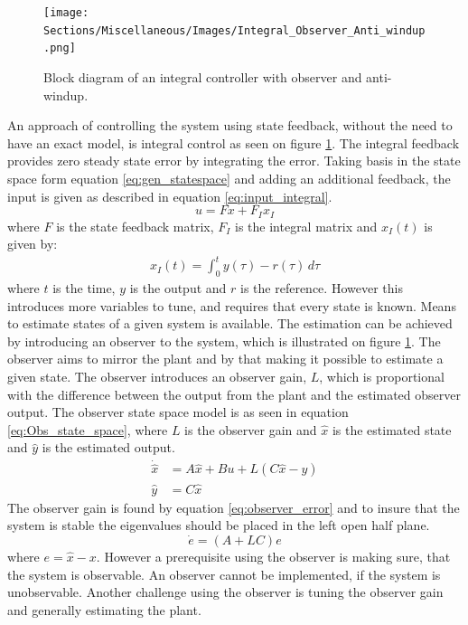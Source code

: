 \documentclass[../../main.tex]{subfiles}
\begin{document}
\begin{figure}
    \centering
    \texttt{[image: Sections/Miscellaneous/Images/Integral\_Observer\_Anti\_windup.png]}
    \caption{Block diagram of an integral controller with observer and anti-windup.}
    \label{fig:Integral_Observer_Diagram}
\end{figure}

An approach of controlling the system using state feedback, without the need to have an exact model, is integral control as seen on figure \ref{fig:Integral_Observer_Diagram}. The integral feedback provides zero steady state error by integrating the error. Taking basis in the state space form equation \ref{eq:gen_statespace} and adding an additional feedback, the input is given as described in equation \ref{eq:input_integral}.
\begin{equation}\label{eq:input_integral}
    u=Fx+F_Ix_I
\end{equation}
where $F$ is the state feedback matrix, $F_I$ is the integral matrix and $x_I(t)$ is given by:
\begin{equation}
    \begin{split}
        x_I(t)=\int_0^t y(\tau)-r(\tau)\,d\tau
    \end{split}
\end{equation}
where $t$ is the time, $y$ is the output and $r$ is the reference. However this introduces more variables to tune, and requires that every state is known. Means to estimate states of a given system is available. The estimation can be achieved by introducing an observer to the system, which is illustrated on figure \ref{fig:Integral_Observer_Diagram}. The observer aims to mirror the plant and by that making it possible to estimate a given state. The observer introduces an observer gain, $L$, which is proportional with the difference between the output from the plant and the estimated observer output. The observer state space model is as seen in equation \ref{eq:Obs_state_space}, where $L$ is the observer gain and $\hat{x}$ is the estimated state and $\hat{y}$ is the estimated output.
\begin{equation}\label{eq:Obs_state_space}
    \begin{split}
        \Dot{\hat{x}}&=A\hat{x}+Bu+L(C\hat{x}-y)\\
        \hat{y}&=C\hat{x}
    \end{split}
\end{equation}
The observer gain is found by equation \ref{eq:observer_error} and to insure that the system is stable the eigenvalues should be placed in the left open half plane.
\begin{equation}\label{eq:observer_error}
    \Dot{e}=(A+LC)e
\end{equation}
where $e=\hat{x}-x$. However a prerequisite using the observer is making sure, that the system is observable. An observer cannot be implemented, if the system is unobservable. Another challenge using the observer is tuning the observer gain and generally estimating the plant. 
\end{document}
